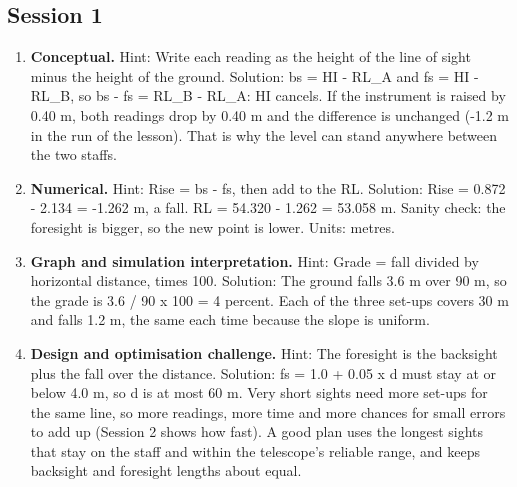 \documentclass[11pt,a4paper]{article}
\begin{document}
\subsection*{Session 1}
\begin{enumerate}[nosep]
\item \textbf{Conceptual.} Hint: Write each reading as the height of the line of sight minus the height of the ground. Solution: bs = HI - RL\_A and fs = HI - RL\_B, so bs - fs = RL\_B - RL\_A: HI cancels. If the instrument is raised by 0.40 m, both readings drop by 0.40 m and the difference is unchanged (-1.2 m in the run of the lesson). That is why the level can stand anywhere between the two staffs.
\item \textbf{Numerical.} Hint: Rise = bs - fs, then add to the RL. Solution: Rise = 0.872 - 2.134 = -1.262 m, a fall. RL = 54.320 - 1.262 = 53.058 m. Sanity check: the foresight is bigger, so the new point is lower. Units: metres.
\item \textbf{Graph and simulation interpretation.} Hint: Grade = fall divided by horizontal distance, times 100. Solution: The ground falls 3.6 m over 90 m, so the grade is 3.6 / 90 x 100 = 4 percent. Each of the three set-ups covers 30 m and falls 1.2 m, the same each time because the slope is uniform.
\item \textbf{Design and optimisation challenge.} Hint: The foresight is the backsight plus the fall over the distance. Solution: fs = 1.0 + 0.05 x d must stay at or below 4.0 m, so d is at most 60 m. Very short sights need more set-ups for the same line, so more readings, more time and more chances for small errors to add up (Session 2 shows how fast). A good plan uses the longest sights that stay on the staff and within the telescope's reliable range, and keeps backsight and foresight lengths about equal.
\end{enumerate}
\end{document}
